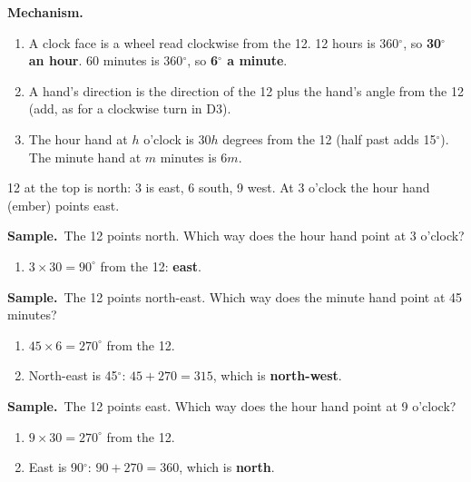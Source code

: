 \documentclass[11pt,a4paper]{article}
\newcommand{\mech}{\textbf{\color{ember}Mechanism.}\ }
\newif\ifkeepsamp
\newcommand{\samp}{\ifkeepsamp\needspace{4\baselineskip}\fi\textbf{\color{ember}Sample.}\ }
\begin{document}
\mech
\begin{enumerate}
\item A clock face is a wheel read clockwise from the 12. 12 hours is 360$^\circ$, so \textbf{30$^\circ$ an hour}. 60 minutes is 360$^\circ$, so \textbf{6$^\circ$ a minute}.
\item A hand's direction is the direction of the 12 plus the hand's angle from the 12 (add, as for a clockwise turn in D3).
\item The hour hand at $h$ o'clock is $30h$ degrees from the 12 (half past adds 15$^\circ$). The minute hand at $m$ minutes is $6m$.
\end{enumerate}

\begin{center}
\par\nopagebreak\smallskip
{\small 12 at the top is north: 3 is east, 6 south, 9 west. At 3 o'clock the hour hand (ember) points east.}
\end{center}

\samp The 12 points north. Which way does the hour hand point at 3 o'clock?
\begin{enumerate}
\item $3 \times 30 = 90^\circ$ from the 12: \textbf{east}.
\end{enumerate}
\samp The 12 points north-east. Which way does the minute hand point at 45 minutes?
\begin{enumerate}
\item $45 \times 6 = 270^\circ$ from the 12.
\item North-east is 45$^\circ$: $45 + 270 = 315$, which is \textbf{north-west}.
\end{enumerate}
\samp The 12 points east. Which way does the hour hand point at 9 o'clock?
\begin{enumerate}
\item $9 \times 30 = 270^\circ$ from the 12.
\item East is 90$^\circ$: $90 + 270 = 360$, which is \textbf{north}.
\end{enumerate}
\end{document}
